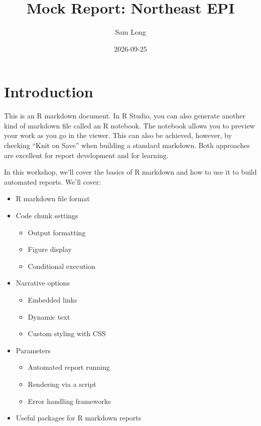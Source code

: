 \documentclass[
]{article}
\title{Mock Report: Northeast EPI}
\author{Sam Long}
\date{2026-09-25}
\begin{document}
\maketitle

\section{Introduction}\label{introduction}

This is an R markdown document. In R Studio, you can also generate
another kind of markdown file called an R notebook. The notebook allows
you to preview your work as you go in the viewer. This can also be
achieved, however, by checking ``Knit on Save'' when building a standard
markdown. Both approaches are excellent for report development and for
learning.

In this workshop, we'll cover the basics of R markdown and how to use it
to build automated reports. We'll cover:

\begin{itemize}
\item
  R markdown file format
\item
  Code chunk settings

  \begin{itemize}
  \item
    Output formatting
  \item
    Figure display
  \item
    Conditional execution
  \end{itemize}
\item
  Narrative options

  \begin{itemize}
  \item
    Embedded links
  \item
    Dynamic text
  \item
    Custom styling with CSS
  \end{itemize}
\item
  Parameters

  \begin{itemize}
  \item
    Automated report running
  \item
    Rendering via a script
  \item
    Error handling frameworks
  \end{itemize}
\item
  Useful packages for R markdown reports
\end{itemize}
\end{document}
